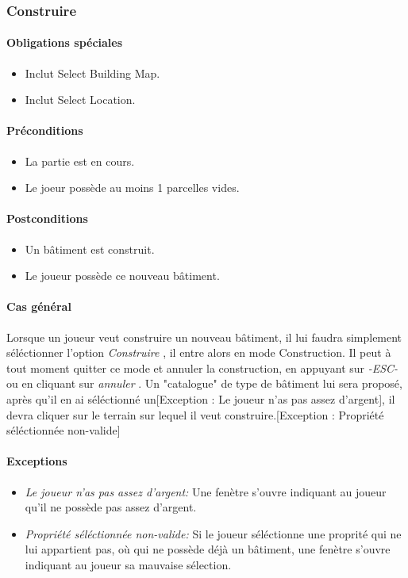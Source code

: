 \documentclass[a4paper,11pt]{report}
\begin{document}
\subsubsection{Construire}
\paragraph{Obligations spéciales}
\begin{itemize}
 \item Inclut Select Building Map.
 \item Inclut Select Location.
\end{itemize}
\paragraph{Préconditions}
\begin{itemize}
 \item La partie est en cours.
 \item Le joeur possède au moins 1 parcelles vides.
\end{itemize}
\newpage
\paragraph{Postconditions}
\begin{itemize}
 \item Un bâtiment est construit.
 \item Le joueur possède ce nouveau bâtiment.
\end{itemize}
\paragraph{Cas général}
Lorsque un joueur veut construire un nouveau bâtiment, il lui faudra simplement séléctionner l'option \og \textit{Construire} \fg, il entre alors en mode Construction. Il peut à tout moment quitter ce mode et annuler la construction, en appuyant sur \og \textit{-ESC-} \fg ou en cliquant sur \og \textit{annuler} \fg. Un "catalogue" de type de bâtiment lui sera proposé, après qu'il en ai séléctionné un[Exception : Le joueur n'as pas assez d'argent], il devra cliquer sur le terrain sur lequel il veut construire.[Exception : Propriété séléctionnée non-valide]
\paragraph{Exceptions}
\begin{itemize}
 \item \textit{Le joueur n'as pas assez d'argent:}  Une fenètre s'ouvre indiquant au joueur qu'il ne possède pas assez d'argent.
 \item \textit{Propriété séléctionnée non-valide:}  Si le joueur séléctionne une proprité qui ne lui appartient pas, où qui ne possède déjà un bâtiment, une fenètre s'ouvre indiquant au joueur sa mauvaise sélection.
\end{itemize}
\end{document}
